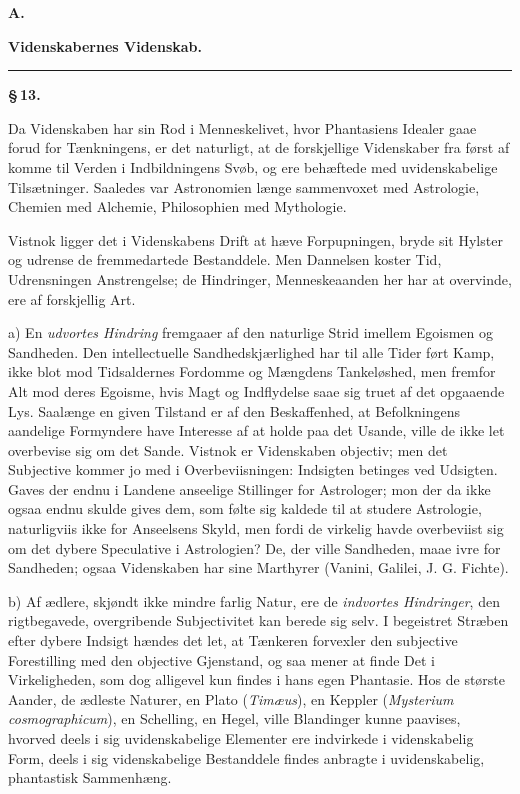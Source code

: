 \documentclass[12pt]{book}
\newcommand{\opage}[1]{\marginnote{\footnotesize\textit{[#1]}}}
\begin{document}
\opage{70} \begin{center}
  {\large\bfseries A.}\par\vspace{2pt}
  {\bfseries Videnskabernes Videnskab.}\par\vspace{4pt}
  \rule{2cm}{0.4pt}
\end{center}
{}

\begin{center}{\bfseries \S\,13.}\end{center}

Da Videnskaben har sin Rod i Menneskelivet, hvor Phantasiens Idealer gaae forud for
Tænkningens, er det naturligt, at de forskjellige Videnskaber fra først af komme til
Verden i Indbildningens Svøb, og ere behæftede med uvidenskabelige Tilsætninger.
Saaledes var Astronomien længe sammenvoxet med Astrologie, Chemien med Alchemie,
Philosophien med Mythologie.

Vistnok ligger det i Videnskabens Drift at hæve Forpupningen, bryde sit Hylster og
udrense de fremmedartede Bestanddele. Men Dannelsen koster Tid, Udrensningen
Anstrengelse; de Hindringer, Menneskeaanden her har at overvinde, ere af forskjellig
Art.

a) En \emph{udvortes Hindring} fremgaaer af den naturlige Strid imellem Egoismen og
Sandheden. Den intellectuelle Sandhedskjærlighed har til alle Tider ført Kamp, ikke
blot mod Tidsaldernes Fordomme og Mængdens Tankeløshed, men fremfor Alt mod deres
Egoisme, hvis Magt og Indflydelse saae sig truet af det opgaaende Lys. Saalænge en
given Tilstand er af den Beskaffenhed, at Befolkningens aandelige Formyndere have
Interesse af at holde paa det Usande, ville de ikke let overbevise sig om det Sande.
Vistnok er Videnskaben objectiv; men det Subjective kommer jo med i Overbeviisningen:
Indsigten betinges ved Udsigten. Gaves der endnu i Landene anseelige Stillinger for
Astrologer; mon der da ikke ogsaa endnu skulde gives dem, som følte sig kaldede til at
studere Astrologie, naturligviis ikke for Anseelsens Skyld, men fordi de virkelig
havde overbeviist sig om det dybere Speculative i Astrologien? De, der ville Sandheden,
maae ivre for Sandheden; ogsaa Videnskaben har sine Marthyrer (Vanini, Galilei, J. G.
Fichte).

b) Af ædlere, skjøndt ikke mindre farlig Natur, ere de \emph{indvortes Hindringer}, den
rigtbegavede, overgribende
\opage{71} Subjectivitet kan berede sig selv. I begeistret Stræben efter dybere Indsigt hændes
det let, at Tænkeren forvexler den subjective Forestilling med den objective Gjenstand,
og saa mener at finde Det i Virkeligheden, som dog alligevel kun findes i hans egen
Phantasie. Hos de største Aander, de ædleste Naturer, en Plato (\textit{Timæus}), en
Keppler (\textit{Mysterium cosmographicum}), en Schelling, en Hegel, ville Blandinger
kunne paavises, hvorved deels i sig uvidenskabelige Elementer ere indvirkede i
videnskabelig Form, deels i sig videnskabelige Bestanddele findes anbragte i
uvidenskabelig, phantastisk Sammenhæng.
\end{document}
